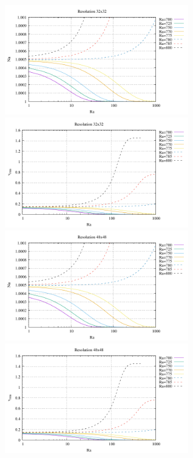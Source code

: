 \begin{center}
\includegraphics[width=8cm]{python_codes/md/results_new/Nu_32x32}
\includegraphics[width=8cm]{python_codes/md/results_new/vrms_32x32}\\
\includegraphics[width=8cm]{python_codes/md/results_new/Nu_48x48}
\includegraphics[width=8cm]{python_codes/md/results_new/vrms_48x48}
\end{center}


\newpage
